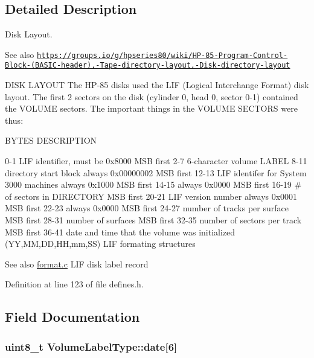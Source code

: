 \subsection{Detailed Description}
Disk Layout. 

\begin{DoxySeeAlso}{See also}
\href{https://groups.io/g/hpseries80/wiki/HP-85-Program-Control-Block-(BASIC-header),-Tape-directory-layout,-Disk-directory-layout}{\tt https\+://groups.\+io/g/hpseries80/wiki/\+H\+P-\/85-\/\+Program-\/\+Control-\/\+Block-\/(\+B\+A\+S\+I\+C-\/header),-\/\+Tape-\/directory-\/layout,-\/\+Disk-\/directory-\/layout}
\end{DoxySeeAlso}
D\+I\+SK L\+A\+Y\+O\+UT The H\+P-\/85 disks used the L\+IF (Logical Interchange Format) disk layout. The first 2 sectors on the disk (cylinder 0, head 0, sector 0-\/1) contained the V\+O\+L\+U\+ME sectors. The important things in the V\+O\+L\+U\+ME S\+E\+C\+T\+O\+RS were thus\+:

B\+Y\+T\+ES D\+E\+S\+C\+R\+I\+P\+T\+I\+ON 

 0-\/1 L\+IF identifier, must be 0x8000 M\+SB first 2-\/7 6-\/character volume L\+A\+B\+EL 8-\/11 directory start block always 0x00000002 M\+SB first 12-\/13 L\+IF identifer for System 3000 machines always 0x1000 M\+SB first 14-\/15 always 0x0000 M\+SB first 16-\/19 \# of sectors in D\+I\+R\+E\+C\+T\+O\+RY M\+SB first 20-\/21 L\+IF version number always 0x0001 M\+SB first 22-\/23 always 0x0000 M\+SB first 24-\/27 number of tracks per surface M\+SB first 28-\/31 number of surfaces M\+SB first 32-\/35 number of sectors per track M\+SB first 36-\/41 date and time that the volume was initialized (YY,MM,DD,HH,mm,SS) L\+IF formating structures \begin{DoxySeeAlso}{See also}
\hyperlink{format_8c}{format.\+c} L\+IF disk label record 
\end{DoxySeeAlso}


Definition at line 123 of file defines.\+h.



\subsection{Field Documentation}
\subsubsection[{\texorpdfstring{date}{date}}]{\setlength{\rightskip}{0pt plus 5cm}uint8\+\_\+t Volume\+Label\+Type\+::date\mbox{[}6\mbox{]}}\hypertarget{structVolumeLabelType_afd5885a37ea57ff74409f8c62a55bd1a}{}\label{structVolumeLabelType_afd5885a37ea57ff74409f8c62a55bd1a}


